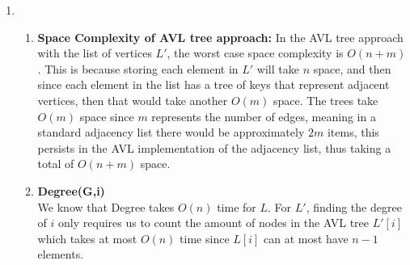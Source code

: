 \documentclass[20pt]{article}
\begin{document}
\begin{enumerate} [label=(\alph*)]
\begin{enumerate} [label=(\arabic*)]
            \textbf{ContainsEdge(G, i, j):}\\
            For both lists $L$ and $\overline{L}$, the time complexity will be $O(n)$. For $L$,
            accessing $L[i]$ takes constant time, and the length of $L[i]$ is bounded by $n$. In the worst case, the edge $(i, j)$ is not in the graph, so iterating through the whole list takes $O(n)$. For $\overline{L}$, we access $\overline{L}[i]$ which also takes constant time, then to find whether or not $j$ is in that list takes $O(n)$ since if edge $(i,j)$ is in the graph it won't exist in $\overline{L}[i]$.\\\\
            \textbf{InsertEdge(G, i, j):}\\
            For list $L$ the time complexity of InsertEdge(G,i,j) is $O(1)$. This is because all that needs to be done is to add the other vertex to the adjacency list of the first vertex and repeat it for the second vertex's adjacency list, which takes constant time for a linked list. For $\overline{L}$, the time complexity would be $O(n)$, since inserting an edge in $\overline{G}$ is the equivalent of deleting an edge in $G$. Thus we must iterate through both adjacency lists of $L[i]$ and $L[j]$ and remove any instances of $j$ or $i$ in each respective list, taking at most $O(n)$ time.
    \end{enumerate}
    \item 
        \begin{enumerate} [label=(\arabic*)]
        \item\textbf{Space Complexity of AVL tree approach:}
            In the AVL tree approach with the list of vertices $L'$, the worst case space complexity is $O(n + m)$. This is because storing each element in $L'$ will take $n$ space, and then since each element in the list has a tree of keys that represent adjacent vertices, then that would take another $O(m)$ space. The trees take $O(m)$ space since $m$ represents the number of edges, meaning in a standard adjacency list there would be approximately $2m$ items, this persists in the AVL implementation of the adjacency list, thus taking a total of $O(n + m)$ space.\\
            
        \item\textbf{Degree(G,i)}\\
            We know that Degree takes $O(n)$ time for $L$. For $L'$, finding the degree of $i$ only requires us to count the amount of nodes in the AVL tree $L'[i]$ which takes at most $O(n)$ time since $L[i]$ can at most have $n-1$ elements.\\
            

\end{enumerate}
\end{enumerate}
\end{document}
